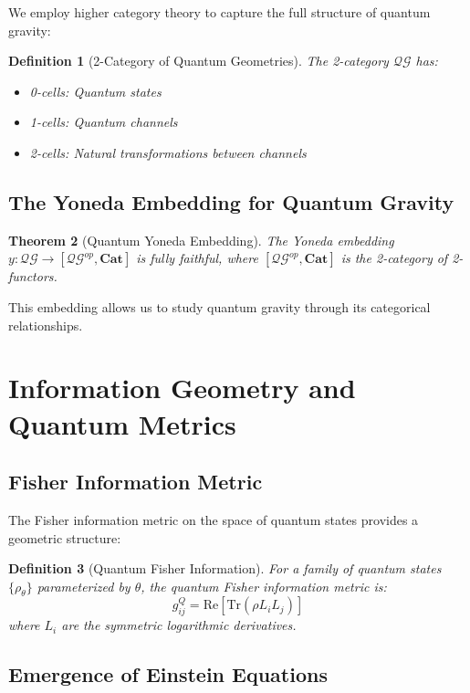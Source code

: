 \documentclass[11pt,a4paper]{article}
\newtheorem{theorem}{Theorem}[section]
\newtheorem{definition}[theorem]{Definition}
\newcommand{\Cat}[1]{\mathbf{#1}}
\begin{document}
We employ higher category theory to capture the full structure of quantum gravity:

\begin{definition}[2-Category of Quantum Geometries]
The 2-category $\mathcal{QG}$ has:
\begin{itemize}
\item 0-cells: Quantum states
\item 1-cells: Quantum channels
\item 2-cells: Natural transformations between channels
\end{itemize}
\end{definition}

\subsection{The Yoneda Embedding for Quantum Gravity}

\begin{theorem}[Quantum Yoneda Embedding]
The Yoneda embedding $y: \mathcal{QG} \to [\mathcal{QG}^{op}, \Cat{Cat}]$ is fully faithful, where $[\mathcal{QG}^{op}, \Cat{Cat}]$ is the 2-category of 2-functors.
\end{theorem}

This embedding allows us to study quantum gravity through its categorical relationships.

\section{Information Geometry and Quantum Metrics}

\subsection{Fisher Information Metric}

The Fisher information metric on the space of quantum states provides a geometric structure:

\begin{definition}[Quantum Fisher Information]
For a family of quantum states $\{\rho_\theta\}$ parameterized by $\theta$, the quantum Fisher information metric is:
\[
g_{ij}^Q = \text{Re}\left[\text{Tr}\left(\rho L_i L_j\right)\right]
\]
where $L_i$ are the symmetric logarithmic derivatives.
\end{definition}

\subsection{Emergence of Einstein Equations}
\end{document}
